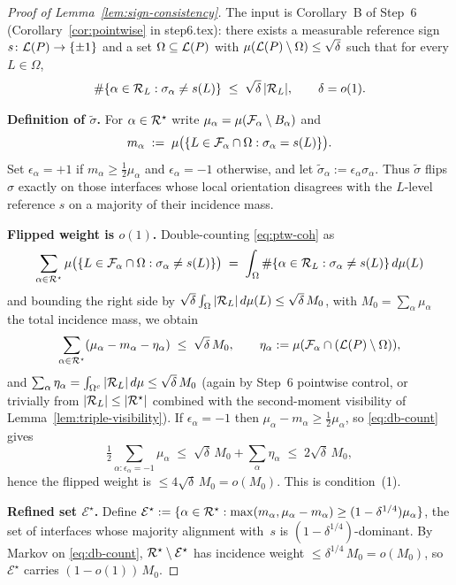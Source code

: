 \begin{proof}[Proof of Lemma~\ref{lem:sign-consistency}]
The input is Corollary~B of Step~6 (Corollary~\ref{cor:pointwise} in
step6.tex): there exists a measurable reference sign
$s\colon\mathcal{L}(P)\to\{\pm1\}$ and a set $\Omega\subseteq\mathcal{L}(P)$ with
$\mu(\mathcal{L}(P)\setminus\Omega)\le\sqrt{\delta}$ such that for every
$L\in\Omega$,
\begin{equation}\label{eq:ptw-coh}
  \#\{\alpha\in\mathcal{R}_L:\sigma_\alpha\ne s(L)\}
  \;\le\; \sqrt{\delta}\,|\mathcal{R}_L|,
  \qquad \delta=o(1).
\end{equation}

\textbf{Definition of $\widetilde\sigma$.}
For $\alpha\in\mathcal{R}^\star$ write $\mu_\alpha=\mu(\mathcal{F}_{\alpha}\setminus
B_\alpha)$ and
\[
  m_\alpha \;:=\;
  \mu\bigl(\{L\in\mathcal{F}_{\alpha}\cap\Omega : \sigma_\alpha=s(L)\}\bigr).
\]
Set $\epsilon_\alpha=+1$ if $m_\alpha\ge\tfrac12\mu_\alpha$ and
$\epsilon_\alpha=-1$ otherwise, and let
$\widetilde\sigma_\alpha:=\epsilon_\alpha\sigma_\alpha$.  Thus
$\widetilde\sigma$ flips $\sigma$ exactly on those interfaces whose
local orientation disagrees with the $L$-level reference $s$ on a
majority of their incidence mass.

\textbf{Flipped weight is $o(1)$.}
Double-counting \eqref{eq:ptw-coh} as
\[
  \sum_{\alpha\in\mathcal{R}^\star}
   \mu\bigl(\{L\in\mathcal{F}_{\alpha}\cap\Omega:\sigma_\alpha\ne s(L)\}\bigr)
  \;=\;
  \int_{\Omega}\#\{\alpha\in\mathcal{R}_L:\sigma_\alpha\ne s(L)\}\,d\mu(L)
\]
and bounding the right side by
$\sqrt{\delta}\int_\Omega|\mathcal{R}_L|\,d\mu(L)\le\sqrt{\delta}\,M_0$, with
$M_0=\sum_\alpha\mu_\alpha$ the total incidence mass, we obtain
\begin{equation}\label{eq:db-count}
  \sum_{\alpha\in\mathcal{R}^\star}(\mu_\alpha - m_\alpha - \eta_\alpha)
  \;\le\; \sqrt{\delta}\,M_0,
  \qquad
  \eta_\alpha:=\mu(\mathcal{F}_{\alpha}\cap(\mathcal{L}(P)\setminus\Omega)),
\end{equation}
and $\sum_\alpha\eta_\alpha=\int_{\Omega^c}|\mathcal{R}_L|\,d\mu\le
\sqrt{\delta}\,M_0$ (again by Step~6 pointwise control, or trivially
from $|\mathcal{R}_L|\le|\mathcal{R}^\star|$ combined with the second-moment
visibility of Lemma~\ref{lem:triple-visibility}).  If
$\epsilon_\alpha=-1$ then $\mu_\alpha-m_\alpha
\ge\tfrac12\mu_\alpha$, so \eqref{eq:db-count} gives
\[
  \tfrac12\sum_{\alpha:\epsilon_\alpha=-1}\mu_\alpha
  \;\le\; \sqrt{\delta}\,M_0 + \sum_\alpha\eta_\alpha
  \;\le\; 2\sqrt{\delta}\,M_0,
\]
hence the flipped weight is $\le 4\sqrt{\delta}\,M_0 = o(M_0)$.
This is condition~(1).

\textbf{Refined set $\mathcal{E}^\star$.}
Define
$\mathcal{E}^\star:=\{\alpha\in\mathcal{R}^\star :
\max(m_\alpha,\mu_\alpha-m_\alpha)\ge(1-\delta^{1/4})\mu_\alpha\}$,
the set of interfaces whose majority alignment with~$s$ is
$(1-\delta^{1/4})$-dominant.  By Markov on \eqref{eq:db-count},
$\mathcal{R}^\star\setminus\mathcal{E}^\star$ has incidence weight
$\le\delta^{1/4}\,M_0=o(M_0)$, so $\mathcal{E}^\star$ carries
$(1-o(1))\,M_0$.


\end{proof}
